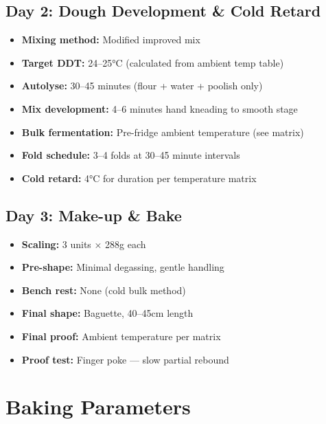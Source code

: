 \documentclass[10pt,a4paper]{article}
\begin{document}
    \subsection{Day 2: Dough Development \& Cold Retard}
    \begin{itemize}[leftmargin=*]
        \item \textbf{Mixing method:} Modified improved mix
        \item \textbf{Target DDT:} 24--25°C (calculated from ambient temp table)
        \item \textbf{Autolyse:} 30--45 minutes (flour + water + poolish only)
        \item \textbf{Mix development:} 4--6 minutes hand kneading to smooth stage
        \item \textbf{Bulk fermentation:} Pre-fridge ambient temperature (see matrix)
        \item \textbf{Fold schedule:} 3--4 folds at 30--45 minute intervals
        \item \textbf{Cold retard:} 4°C for duration per temperature matrix
    \end{itemize}

    \subsection{Day 3: Make-up \& Bake}
    \begin{itemize}[leftmargin=*]
        \item \textbf{Scaling:} 3 units × 288g each
        \item \textbf{Pre-shape:} Minimal degassing, gentle handling
        \item \textbf{Bench rest:} None (cold bulk method)
        \item \textbf{Final shape:} Baguette, 40--45cm length
        \item \textbf{Final proof:} Ambient temperature per matrix
        \item \textbf{Proof test:} Finger poke --- slow partial rebound
    \end{itemize}

    \section{Baking Parameters}
\end{document}
